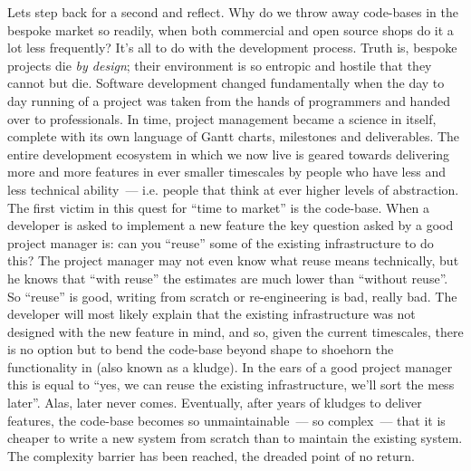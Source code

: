 \documentclass{memoir}
\begin{document}
Lets step back for a second and reflect. Why do we throw away
code-bases in the bespoke market so readily, when both commercial and
open source shops do it a lot less frequently? It's all to do with the
development process. Truth is, bespoke projects die \emph{by design};
their environment is so entropic and hostile that they cannot but
die. Software development changed fundamentally when the day to day
running of a project was taken from the hands of programmers and
handed over to professionals. In time, project management became a
science in itself, complete with its own language of Gantt charts,
milestones and deliverables. The entire development ecosystem in which
we now live is geared towards delivering more and more features in
ever smaller timescales by people who have less and less technical
ability~--- i.e. people that think at ever higher levels of
abstraction. The first victim in this quest for ``time to market'' is
the code-base. When a developer is asked to implement a new feature
the key question asked by a good project manager is: can you ``reuse''
some of the existing infrastructure to do this? The project manager
may not even know what reuse means technically, but he knows that
``with reuse'' the estimates are much lower than ``without reuse''. So
``reuse'' is good, writing from scratch or re-engineering is bad, really
bad. The developer will most likely explain that the existing
infrastructure was not designed with the new feature in mind, and so,
given the current timescales, there is no option but to bend the
code-base beyond shape to shoehorn the functionality in (also known as
a kludge). In the ears of a good project manager this is equal to
``yes, we can reuse the existing infrastructure, we'll sort the mess
later''. Alas, later never comes. Eventually, after years of kludges to
deliver features, the code-base becomes so unmaintainable~--- so
complex~--- that it is cheaper to write a new system from scratch than
to maintain the existing system. The complexity barrier has been
reached, the dreaded point of no return.
\end{document}
